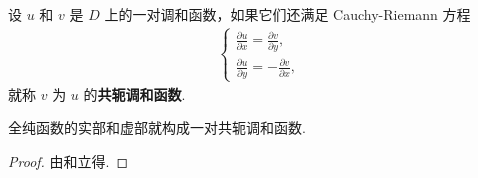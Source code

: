 \documentclass[../../main.tex]{subfiles}
\begin{document}
\begin{definition}[共轭调和函数]
设 $u$ 和 $v$ 是 $D$ 上的一对调和函数，如果它们还满足 Cauchy-Riemann 方程
\begin{align}
\begin{cases} 
\displaystyle \frac{\partial u}{\partial x} = \frac{\partial v}{\partial y}, \\
\displaystyle \frac{\partial u}{\partial y} = -\frac{\partial v}{\partial x},
\end{cases} \label{eq:2.2.10}
\end{align}
就称 $v$ 为 $u$ 的\textbf{共轭调和函数}.
\end{definition}

\begin{proposition}
全纯函数的实部和虚部就构成一对共轭调和函数.
\end{proposition}
\begin{proof}
由和立得.

\end{proof}
\end{document}
